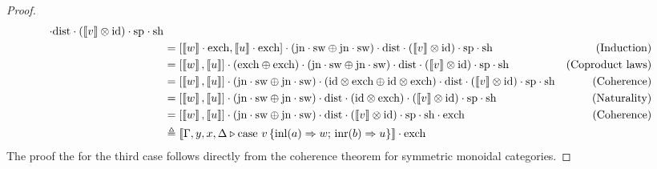 \documentclass[a4paper,UKenglish,cleveref, autoref, thm-restate]{lipics-v2021}
\begin{document}
\begin{proof}
\begin{align*}
  \cdot \mathrm{dist} \cdot (\left \llbracket v \right \rrbracket \otimes \mathrm{id}) \cdot 
  \text{sp}_{} 
  \cdot \text{sh}_{}  \\
  & = [\left \llbracket  w  \right \rrbracket  \cdot \text{exch}, \left \llbracket u \right \rrbracket\cdot \text{exch}] \cdot (\text{jn}\cdot \mathrm{sw} \oplus \text{jn} \cdot \mathrm{sw}) \cdot \mathrm{dist} \cdot (\left \llbracket v \right \rrbracket \otimes \mathrm{id}) \cdot\text{sp} \cdot \text{sh}
  & \text{(Induction)}\\
  & = [\left \llbracket  w  \right \rrbracket, \left \llbracket u \right \rrbracket] 
  \cdot (\text{exch} \oplus \text{exch}) 
  \cdot (\text{jn}\cdot \mathrm{sw} \oplus \text{jn} \cdot \mathrm{sw}) 
  \cdot \mathrm{dist} \cdot (\left \llbracket v \right \rrbracket \otimes \mathrm{id}) \cdot\text{sp} \cdot \text{sh} 
  & \text{(Coproduct laws)}
  \\
  & = [\left \llbracket  w  \right \rrbracket, \left \llbracket u \right \rrbracket] 
  \cdot (\text{jn}\cdot \mathrm{sw} \oplus \text{jn} \cdot \mathrm{sw}) 
  \cdot (\mathrm{id} \otimes \text{exch} \oplus \mathrm{id} \otimes \text{exch})
  \cdot \mathrm{dist} \cdot (\left \llbracket v \right \rrbracket \otimes \mathrm{id}) \cdot\text{sp} \cdot \text{sh} 
  & \text{(Coherence)}
  \\
  & = [\left \llbracket  w  \right \rrbracket, \left \llbracket u \right \rrbracket] 
  \cdot (\text{jn}\cdot \mathrm{sw} \oplus \text{jn} \cdot \mathrm{sw}) 
  \cdot \mathrm{dist} 
  \cdot (\mathrm{id} \otimes \text{exch}) \cdot (\left \llbracket v \right \rrbracket \otimes \mathrm{id}) \cdot\text{sp} \cdot \text{sh} 
  & \text{(Naturality)}
  \\
  & = [\left \llbracket  w  \right \rrbracket, \left \llbracket u \right \rrbracket] 
  \cdot (\text{jn}\cdot \mathrm{sw} \oplus \text{jn} \cdot \mathrm{sw}) 
  \cdot \mathrm{dist} 
  \cdot (\left \llbracket v \right \rrbracket \otimes \mathrm{id}) \cdot\text{sp} \cdot \text{sh} 
  \cdot \text{exch}
  & \text{(Coherence)}
  \\
  & \triangleq \left \llbracket \Gamma,y, x, \Delta \triangleright \text{case } v\,  \{\text{inl} (a) \Rightarrow w ;\, \text{inr} (b) \Rightarrow u\} \right \rrbracket 
  \cdot \text{exch}_{}
  \end{align*}
The proof the for the third case follows directly from the coherence theorem
for symmetric monoidal categories.


\end{proof}
\end{document}
